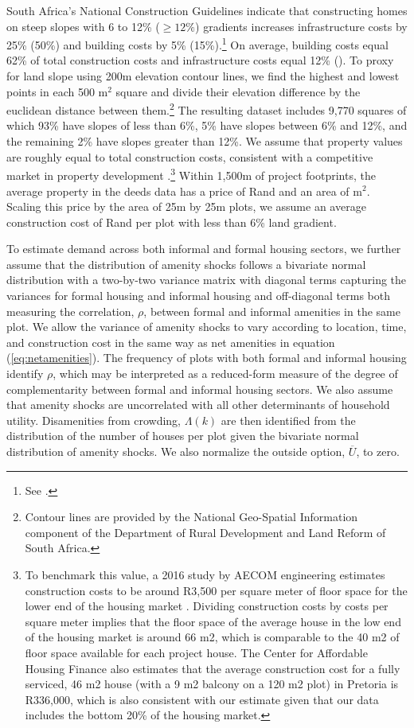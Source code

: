 \documentclass[12pt]{article}
\begin{document}
South Africa's National Construction Guidelines indicate that constructing homes on steep slopes with 6 to 12\% ($\geq12\%$) gradients increases infrastructure costs by 25\% (50\%) and building costs by 5\% (15\%).\footnote{See \cite{redbook}.}  On average, building costs equal 62\% of total construction costs and infrastructure costs equal 12\% (\cite{cahfcosts}).  To proxy for land slope using 200m elevation contour lines, we find the highest and lowest points in each 500 $\text{m}^{2}$ square and divide their elevation difference by the euclidean distance between them.\footnote{Contour lines are provided by the National Geo-Spatial Information component of the Department of Rural Development and Land Reform of South Africa. }  The resulting dataset includes 9,770 squares of which 93\% have slopes of less than 6\%, 5\% have slopes between 6\% and 12\%, and the remaining 2\% have slopes greater than 12\%.  We assume that property values are roughly equal to total construction costs, consistent with a competitive market in property development \citep{cahfcosts}.\footnote{To benchmark this value, a 2016 study by AECOM engineering estimates construction costs to be around R3,500 per square meter of floor space for the lower end of the housing market \citep{aecom}.  Dividing construction costs by costs per square meter implies that the floor space of the average house in the low end of the housing market is around 66 m2, which is comparable to the 40 m2 of floor space available for each project house.  The Center for Affordable Housing Finance also estimates that the average construction cost for a fully serviced, 46 m2 house (with a 9 m2 balcony on a 120 m2 plot) in Pretoria is R336,000, which is also consistent with our estimate given that our data includes the bottom 20\% of the housing market.}  Within 1,500m of project footprints, the average property in the deeds data has a price of Rand and an area of $\text{m}^{2}$.  Scaling this price by the area of 25m by 25m plots, we assume an average construction cost of Rand per plot with less than 6\% land gradient.

To estimate demand across both informal and formal housing sectors, we further assume that the distribution of amenity shocks follows a bivariate normal distribution with a two-by-two variance matrix with diagonal terms capturing the variances for formal housing and informal housing and off-diagonal terms both measuring the correlation, $\rho$, between formal and informal amenities in the same plot.  We allow the variance of amenity shocks to vary according to location, time, and construction cost in the same way as net amenities in equation (\ref{eq:netamenities}).  The frequency of plots with both formal and informal housing identify $\rho$, which may be interpreted as a reduced-form measure of the degree of complementarity between formal and informal housing sectors.  We also assume that amenity shocks are uncorrelated with all other determinants of household utility.  Disamenities from crowding, $\Lambda(k)$ are then identified from the distribution of the number of houses per plot given the bivariate normal distribution of amenity shocks.  We also normalize the outside option, $\overline{U}$, to zero. 
\end{document}
